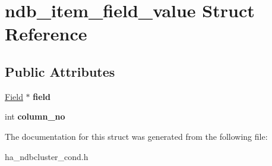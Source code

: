 \hypertarget{structndb__item__field__value}{}\section{ndb\+\_\+item\+\_\+field\+\_\+value Struct Reference}
\label{structndb__item__field__value}
\subsection*{Public Attributes}
\begin{DoxyCompactItemize}
\item 
\mbox{\label{structndb__item__field__value_adc5ef1b9c4e7be56d12a399d497f591e}} 
\mbox{\hyperlink{classField}{Field}} $\ast$ {\bfseries field}
\item 
\mbox{\label{structndb__item__field__value_af43b388ee78617eb62eb5335a0f2091c}} 
int {\bfseries column\+\_\+no}
\end{DoxyCompactItemize}


The documentation for this struct was generated from the following file\+:\begin{DoxyCompactItemize}
\item 
ha\+\_\+ndbcluster\+\_\+cond.\+h\end{DoxyCompactItemize}

